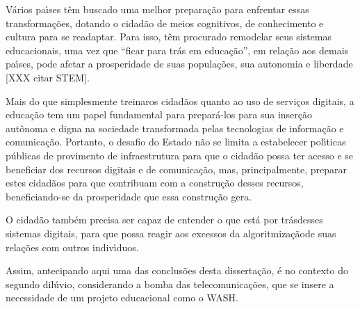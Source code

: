 \documentclass[
12pt,		%
openright,	%
twoside,  %
a4paper,			%
chapter=TITLE,		%
english,			%
french,				%
spanish,			%
brazil				%
]{USPSC-classe/USPSC}
\begin{document}
V\'arios pa\'{\i}ses t\^em buscado uma melhor prepara\c{c}\~ao para enfrentar essas transforma\c{c}\~oes, dotando o cidad\~ao de meios cognitivos, de conhecimento e cultura para se readaptar. Para isso, t\^em procurado remodelar seus sistemas educacionais, uma vez que “ficar para tr\'as em educa\c{c}\~ao”, em rela\c{c}\~ao aos demais pa\'{\i}ses, pode afetar a prosperidade de suas popula\c{c}\~oes, sua autonomia e liberdade [XXX citar STEM].














Mais do que simplesmente \textquotedbl treinar\textquotedbl  os cidad\~aos quanto ao uso  de servi\c{c}os digitais, a educa\c{c}\~ao tem um papel fundamental para prepar\'a-los para sua inser\c{c}\~ao aut\^onoma e digna na sociedade transformada pelas tecnologias de informa\c{c}\~ao e comunica\c{c}\~ao. Portanto, o desafio do Estado n\~ao se limita a estabelecer pol\'{\i}ticas p\'ublicas de provimento de infraestrutura para que o cidad\~ao possa ter acesso e se beneficiar dos recursos digitais e de comunica\c{c}\~ao, mas, principalmente, preparar estes cidad\~aos para que contribuam com a  constru\c{c}\~ao desses recursos, beneficiando-se da prosperidade que  essa constru\c{c}\~ao gera.














O cidad\~ao tamb\'em precisa ser capaz de entender \textquotedbl o que est\'a por tr\'as\textquotedbl  desses sistemas digitais, para que possa reagir aos excessos da \textquotedbl algoritmiza\c{c}\~ao\textquotedbl  de suas rela\c{c}\~oes com outros indiv\'{\i}duos.














Assim, antecipando aqui uma das conclus\~oes desta disserta\c{c}\~ao, \'e no contexto do \textquotedbl segundo dil\'uvio\textquotedbl , considerando a bomba das telecomunica\c{c}\~oes, que se insere a necessidade de um projeto educacional como o WASH.
\end{document}
